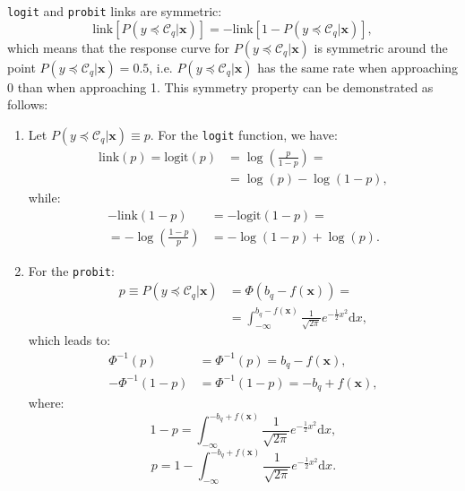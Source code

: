 \documentclass[preprint]{elsarticle}
\begin{document}
\texttt{logit} and \texttt{probit} links are symmetric:	
\begin{equation}
\nonumber
\text{link}[P(y \preceq \mathcal{C}_q | \mathbf{x})] = -\text{link}[1 - P(y \preceq \mathcal{C}_q | \mathbf{x})],
\end{equation}
which means that the response curve for $P(y \preceq \mathcal{C}_q | \mathbf{x})$ is symmetric around the point $P(y \preceq \mathcal{C}_q | \mathbf{x}) = 0.5$, i.e. $P(y \preceq \mathcal{C}_q | \mathbf{x})$ has the same rate when approaching 0 than when approaching 1. This symmetry property can be demonstrated as follows:	
\begin{enumerate}
	\item Let $P(y \preceq \mathcal{C}_q | \mathbf{x}) \equiv p$. For the \texttt{logit} function, we have:
	\begin{equation}
	\nonumber
	\begin{aligned}
	\text{link}(p) = \text{logit}(p) &= \log\left(\frac{p}{1-p}\right) =\\
	&= \log(p) - \log(1-p),
	\end{aligned}
	\end{equation}			
	while:			
	\begin{equation}
	\nonumber
	\begin{aligned}
	-\text{link}(1 - p) &= -\text{logit}(1 - p) =\\
	=- \log\left(\frac{1- p}{p}\right) &= - \log(1 - p) + \log(p).
	\end{aligned}
	\end{equation}
	
	\item For the \texttt{probit}:		
	\begin{equation}
	\nonumber
	\begin{aligned}
	p \equiv P(y \preceq \mathcal{C}_q | \mathbf{x}) &= \Phi(b_q - f(\mathbf{x})) =\\
	&= \int_{-\infty}^{b_q - f(\mathbf{x})} \frac{1}{\sqrt{2\pi}} e^{-\frac{1}{2}x^2} \mathrm{d}x,
	\end{aligned}
	\end{equation}
	which leads to:
	\begin{align}
	\nonumber \Phi^{-1}(p) & = \Phi^{-1}(p) = b_q - f(\mathbf{x}),\\
	\nonumber -\Phi^{-1}(1-p) &= \Phi^{-1}(1-p) = -b_q + f(\mathbf{x}),
	\end{align}
	where:		
	\begin{equation}
	\nonumber
	1 - p = \int_{-\infty}^{-b_q + f(\mathbf{x})} \frac{1}{\sqrt{2\pi}} e^{-\frac{1}{2}x^2} \mathrm{d}x,
	\end{equation}
	\begin{equation}
	\nonumber
	p = 1 - \int_{-\infty}^{-b_q + f(\mathbf{x})} \frac{1}{\sqrt{2\pi}} e^{-\frac{1}{2}x^2} \mathrm{d}x.
	\end{equation}
\end{enumerate}
\end{document}
